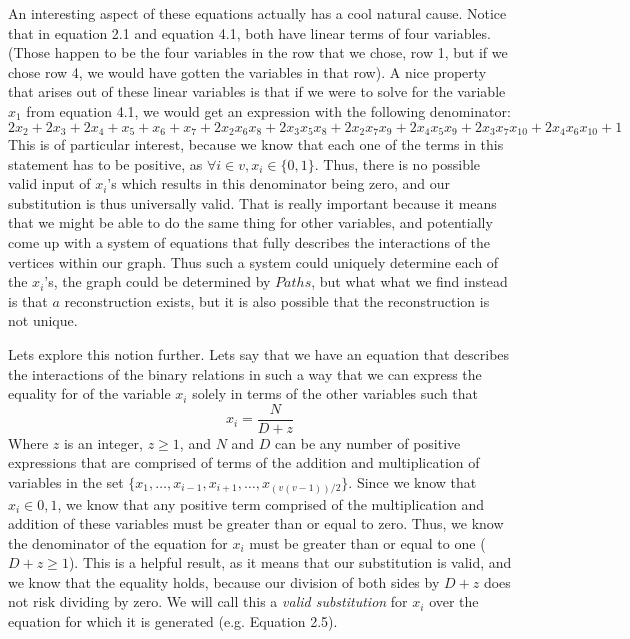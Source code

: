 \documentclass[11pt,a4paper]{report}
\begin{document}
An interesting aspect of these equations actually has a cool natural cause.  
Notice that in equation 2.1 and equation 4.1, both have linear terms of four variables.  
(Those happen to be the four variables in the row that we chose, row 1, but if we chose row 4, we would have gotten the variables in that row). 
A nice property that arises out of these linear variables is that if we were to solve for the variable \(x_1\) from equation 4.1, we would get an expression with the following denominator: 
\[2x_2 + 2x_3 + 2x_4 + x_5 + x_6 + x_7 + 2x_2x_6x_8 + 2x_3x_5x_8 + 2x_2x_7x_9 + 2x_4x_5x_9 + 2x_3x_7x_{10} + 2x_4x_6x_{10} + 1\]
This is of particular interest, because we know that each one of the terms in this statement has to be positive, as \(\forall i \in v,  x_i \in \{0, 1\}\).  
Thus, there is no possible valid input of \(x_i\)'s which results in this denominator being zero, and our substitution is thus universally valid.  
That is really important because it means that we might be able to do the same thing for other variables, and potentially come up with a system of equations that fully describes the interactions of the vertices within our graph. 
Thus such a system could uniquely determine each of the \(x_i\)'s, the graph could be determined by \(Paths\), but what what we find instead is that \(a\) reconstruction exists, but it is also possible that the reconstruction is not unique.

Lets explore this notion further.  
Lets say that we have an equation that describes the interactions of the binary relations in such a way that we can express the equality for of the variable 
\(x_i\) solely in terms of the other variables such that \[x_i = \frac{N}{D + z}\] Where \(z\) is an integer, \(z \geq 1\), and \(N\) and \(D\) 
can be any number of positive expressions that are comprised of terms of the addition and multiplication of variables in the set 
\(\{x_1, \dots,  x_{i-1},x_{i+1}, \dots, x_{(v(v-1))/2}\}\).  Since we know that \(x_i \in {0,1}\), we know that any positive term comprised of the multiplication and addition of these variables must be greater than or equal to zero.  
Thus, we know the denominator of the equation for \(x_i\) must be greater than or equal to one (\(D + z \geq 1\)). 
This is a helpful result, as it means that our substitution is valid, and we know that the equality holds, because our division of both sides by \(D + z\) 
does not risk dividing by zero.  We will call this a \emph{valid substitution} for \(x_i\) over the equation for which it is generated (e.g. Equation 2.5). 
\end{document}
